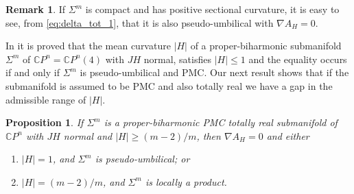 \documentclass[11pt]{amsart}
\theoremstyle{plain}
\newtheorem{proposition}  [theorem]  {Proposition}
\theoremstyle{definition}
\newtheorem{remark}       [theorem]  {Remark}
\numberwithin{equation}{section}
\begin{document}
\begin{remark} If $\Sigma^m$ is compact and has positive sectional curvature, it is easy to see, from \eqref{eq:delta_tot_1}, that it is also pseudo-umbilical with $\nabla A_H=0$.
\end{remark}

In \cite{FLMO} it is proved that the mean curvature $|H|$ of a proper-biharmonic submanifold $\Sigma^m$ of $\mathbb{C}P^n=\mathbb{C}P^n(4)$ with $JH$ normal, satisfies $|H|\leq 1$ and the equality occurs if and only if $\Sigma^m$ is pseudo-umbilical and PMC. Our next result shows that if the submanifold is assumed to be PMC and also totally real we have a gap in the admissible range of $|H|$. 

\begin{proposition}\label{prop:pb_cpn} If $\Sigma^m$ is a proper-biharmonic PMC totally real submanifold of $\mathbb{C}P^n$ with $JH$ normal and $|H|\geq(m-2)/m$, then $\nabla A_H=0$ and either
\begin{enumerate}

\item $|H|=1$, and $\Sigma^m$ is pseudo-umbilical; or

\item $|H|=(m-2)/m$, and $\Sigma^m$ is locally a product.
\end{enumerate}
\end{proposition}
\end{document}
